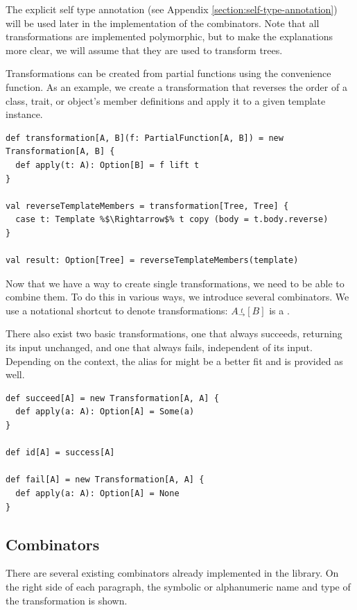 The explicit self type annotation (see Appendix \vref{section:self-type-annotation}) will be used later in the implementation of the combinators. Note that all transformations are implemented polymorphic, but to make the explanations more clear, we will assume that they are used to transform trees.

Transformations can be created from partial functions using the  convenience function. As an example, we create a transformation that reverses the order of a class, trait, or object's member definitions and apply it to a given template instance.

\begin{lstlisting}
def transformation[A, B](f: PartialFunction[A, B]) = new Transformation[A, B] {
  def apply(t: A): Option[B] = f lift t
}

val reverseTemplateMembers = transformation[Tree, Tree] {
  case t: Template %$\Rightarrow$% t copy (body = t.body.reverse)
}

val result: Option[Tree] = reverseTemplateMembers(template)
\end{lstlisting}

Now that we have a way to create single transformations, we need to be able to combine them. To do this in various ways, we introduce several combinators. We use a notational shortcut to denote transformations: $A \overset{t}{_\rightarrow} [B]$ is a .

There also exist two basic transformations, one that always succeeds, returning its input unchanged, and one that always fails, independent of its input. Depending on the context, the alias  for  might be a better fit and is provided as well.

\begin{lstlisting}
def succeed[A] = new Transformation[A, A] {
  def apply(a: A): Option[A] = Some(a)
}

def id[A] = success[A]

def fail[A] = new Transformation[A, A] {
  def apply(a: A): Option[A] = None
}
\end{lstlisting}

\subsection{Combinators}

There are several existing combinators already implemented in the library. On the right side of each paragraph, the symbolic or alphanumeric name and type of the transformation is shown.

